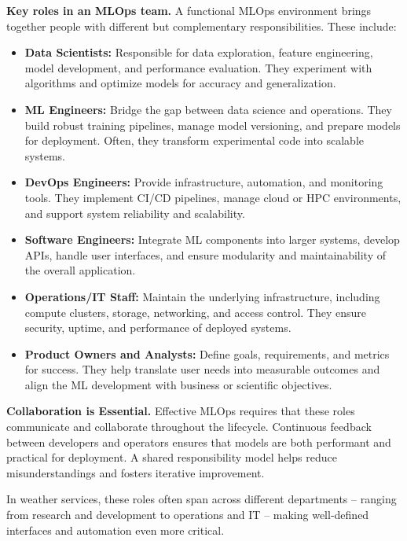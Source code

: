 {\bf Key roles in an MLOps team.} A functional MLOps environment brings together people with different but complementary responsibilities. These include:

\begin{itemize}
	\item \textbf{Data Scientists:} 
	Responsible for data exploration, feature engineering, model development, and performance evaluation. They experiment with algorithms and optimize models for accuracy and generalization.
	
	\item \textbf{ML Engineers:} 
	Bridge the gap between data science and operations. They build robust training pipelines, manage model versioning, and prepare models for deployment. Often, they transform experimental code into scalable systems.
	
	\item \textbf{DevOps Engineers:} 
	Provide infrastructure, automation, and monitoring tools. They implement CI/CD pipelines, manage cloud or HPC environments, and support system reliability and scalability.
	
	\item \textbf{Software Engineers:} 
	Integrate ML components into larger systems, develop APIs, handle user interfaces, and ensure modularity and maintainability of the overall application.
	
	\item \textbf{Operations/IT Staff:} 
	Maintain the underlying infrastructure, including compute clusters, storage, networking, and access control. They ensure security, uptime, and performance of deployed systems.
	
	\item \textbf{Product Owners and Analysts:} 
	Define goals, requirements, and metrics for success. They help translate user needs into measurable outcomes and align the ML development with business or scientific objectives.
\end{itemize}

{\bf Collaboration is Essential.} Effective MLOps requires that these roles communicate and collaborate throughout the lifecycle. Continuous feedback between developers and operators ensures that models are both performant and practical for deployment. A shared responsibility model helps reduce misunderstandings and fosters iterative improvement.

In weather services, these roles often span across different departments -- ranging from research and development to operations and IT -- making well-defined interfaces and automation even more critical.


